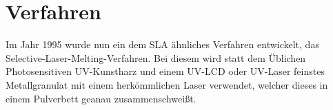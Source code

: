 \documentclass[main.tex]{subfiles}
\begin{document}
\section{Verfahren}
Im Jahr 1995 wurde nun ein dem SLA ähnliches Verfahren entwickelt, das Selective-Laser-Melting-Verfahren. Bei diesem wird statt dem Üblichen Photosensitiven UV-Kunstharz und einem UV-LCD oder UV-Laser feinstes Metallgranulat mit einem herkömmlichen Laser verwendet, welcher dieses in einem Pulverbett geanau zusammenschweißt. \parencite{3FAKTUR_1}
\end{document}
